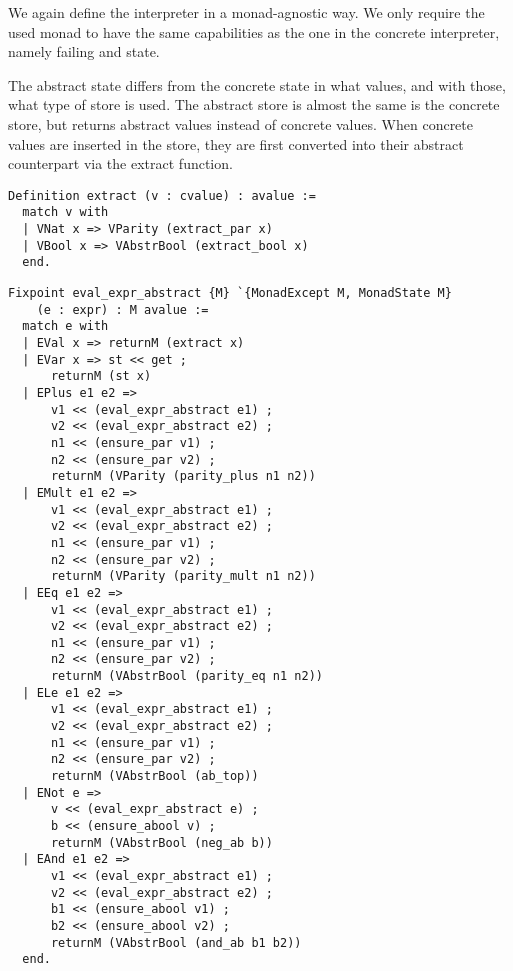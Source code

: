 We again define the interpreter in a monad-agnostic way. We only require the
used monad to have the same capabilities as the one in the concrete
interpreter, namely failing and state.

The abstract state differs from the concrete state in what values, and with
those, what type of store is
used. The abstract store is almost the same is the concrete store, but returns
abstract values instead of concrete values. When concrete values are inserted
in the store, they are first converted into their abstract counterpart via the
extract function.

\begin{listing}[H]
\begin{verbatim}
Definition extract (v : cvalue) : avalue :=
  match v with
  | VNat x => VParity (extract_par x)
  | VBool x => VAbstrBool (extract_bool x)
  end.
\end{verbatim}
\end{listing}

\begin{listing}[H]
\begin{verbatim}
Fixpoint eval_expr_abstract {M} `{MonadExcept M, MonadState M} 
    (e : expr) : M avalue :=
  match e with
  | EVal x => returnM (extract x)
  | EVar x => st << get ;
      returnM (st x)
  | EPlus e1 e2 => 
      v1 << (eval_expr_abstract e1) ;
      v2 << (eval_expr_abstract e2) ;
      n1 << (ensure_par v1) ;
      n2 << (ensure_par v2) ;
      returnM (VParity (parity_plus n1 n2))
  | EMult e1 e2 =>
      v1 << (eval_expr_abstract e1) ;
      v2 << (eval_expr_abstract e2) ;
      n1 << (ensure_par v1) ;
      n2 << (ensure_par v2) ;
      returnM (VParity (parity_mult n1 n2))
  | EEq e1 e2 =>
      v1 << (eval_expr_abstract e1) ;
      v2 << (eval_expr_abstract e2) ;
      n1 << (ensure_par v1) ;
      n2 << (ensure_par v2) ;
      returnM (VAbstrBool (parity_eq n1 n2))
  | ELe e1 e2 =>
      v1 << (eval_expr_abstract e1) ;
      v2 << (eval_expr_abstract e2) ;
      n1 << (ensure_par v1) ;
      n2 << (ensure_par v2) ;
      returnM (VAbstrBool (ab_top))
  | ENot e =>
      v << (eval_expr_abstract e) ;
      b << (ensure_abool v) ;
      returnM (VAbstrBool (neg_ab b))
  | EAnd e1 e2 =>
      v1 << (eval_expr_abstract e1) ;
      v2 << (eval_expr_abstract e2) ;
      b1 << (ensure_abool v1) ;
      b2 << (ensure_abool v2) ;
      returnM (VAbstrBool (and_ab b1 b2))
  end.
\end{verbatim}
\end{listing}

